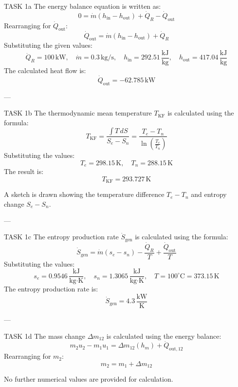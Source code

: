 TASK 1a  
The energy balance equation is written as:  
\[
0 = \dot{m}(h_{\text{in}} - h_{\text{out}}) + \dot{Q}_R - \dot{Q}_{\text{out}}
\]  
Rearranging for \(\dot{Q}_{\text{out}}\):  
\[
\dot{Q}_{\text{out}} = \dot{m}(h_{\text{in}} - h_{\text{out}}) + \dot{Q}_R
\]  
Substituting the given values:  
\[
\dot{Q}_R = 100 \, \text{kW}, \quad \dot{m} = 0.3 \, \text{kg/s}, \quad h_{\text{in}} = 292.51 \, \frac{\text{kJ}}{\text{kg}}, \quad h_{\text{out}} = 417.04 \, \frac{\text{kJ}}{\text{kg}}
\]  
The calculated heat flow is:  
\[
\dot{Q}_{\text{out}} = -62.785 \, \text{kW}
\]  

---

TASK 1b  
The thermodynamic mean temperature \( T_{\text{KF}} \) is calculated using the formula:  
\[
T_{\text{KF}} = \frac{\int T \, dS}{S_e - S_n} = \frac{T_e - T_n}{\ln\left(\frac{T_e}{T_n}\right)}
\]  
Substituting the values:  
\[
T_e = 298.15 \, \text{K}, \quad T_n = 288.15 \, \text{K}
\]  
The result is:  
\[
T_{\text{KF}} = 293.727 \, \text{K}
\]  

A sketch is drawn showing the temperature difference \( T_e - T_n \) and entropy change \( S_e - S_n \).  

---

TASK 1c  
The entropy production rate \(\dot{S}_{\text{gen}}\) is calculated using the formula:  
\[
\dot{S}_{\text{gen}} = \dot{m}(s_e - s_n) - \frac{\dot{Q}_R}{T} + \frac{\dot{Q}_{\text{out}}}{T}
\]  
Substituting the values:  
\[
s_e = 0.9546 \, \frac{\text{kJ}}{\text{kg·K}}, \quad s_n = 1.3065 \, \frac{\text{kJ}}{\text{kg·K}}, \quad T = 100^\circ\text{C} = 373.15 \, \text{K}
\]  
The entropy production rate is:  
\[
\dot{S}_{\text{gen}} = 4.3 \, \frac{\text{kW}}{\text{K}}
\]  

---

TASK 1d  
The mass change \(\Delta m_{12}\) is calculated using the energy balance:  
\[
m_2 u_2 - m_1 u_1 = \Delta m_{12}(h_m) + \dot{Q}_{\text{out},12}
\]  
Rearranging for \( m_2 \):  
\[
m_2 = m_1 + \Delta m_{12}
\]  

No further numerical values are provided for calculation.